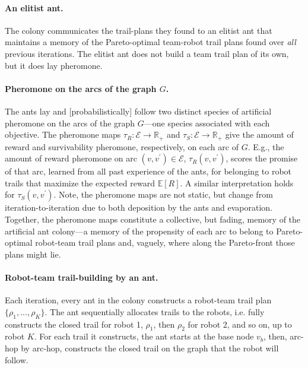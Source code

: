 \documentclass[11pt, oneside]{article}
\begin{document}
\paragraph{An elitist ant.} The colony communicates the trail-plans they found to an elitist ant \cite{dorigo1996ant} that maintains a memory of the Pareto-optimal team-robot trail plans found over \emph{all} previous iterations. The elitist ant does not build a team trail plan of its own, but it does lay pheromone.


\paragraph{Pheromone on the arcs of the graph $G$.}
The ants lay and [probabilistically] follow two distinct species of artificial pheromone on the arcs of the graph $G$---one species associated with each objective. 
The pheromone maps $\tau_R:\mathcal{E}\rightarrow \mathbb{R}_+$ and $\tau_S:\mathcal{E}\rightarrow \mathbb{R}_+$ give the amount of reward and survivability pheromone, respectively, on each arc of $G$.
E.g., the amount of reward pheromone on arc $(v, v^\prime)\in\mathcal{E}$, $\tau_R(v, v^\prime)$, scores the promise of that arc, learned from all past experience of the ants, for belonging to robot trails that maximize the expected reward $\mathbb{E}[R]$. A similar interpretation holds for $\tau_S(v, v^\prime)$. 
Note, the pheromone maps are not static, but change from iteration-to-iteration due to both deposition by the ants and evaporation. 
Together, the pheromone maps constitute a collective, but fading, memory of the artificial ant colony---a memory of the propensity of each arc to belong to Pareto-optimal robot-team trail plans and, vaguely, where along the Pareto-front those plans might lie.

 
\paragraph{Robot-team trail-building by an ant.}
Each iteration, every ant in the colony constructs a robot-team trail plan $\{\rho_1, ..., \rho_K\}$.
The ant sequentially allocates trails to the robots, 
i.e. fully constructs the closed trail for robot 1, $\rho_1$, then $\rho_2$ for robot 2, and so on, up to robot $K$.
For each trail it constructs, the ant starts at the base node $v_b$, then, arc-hop by arc-hop, constructs the closed trail on the graph that the robot will follow. 
\end{document}
